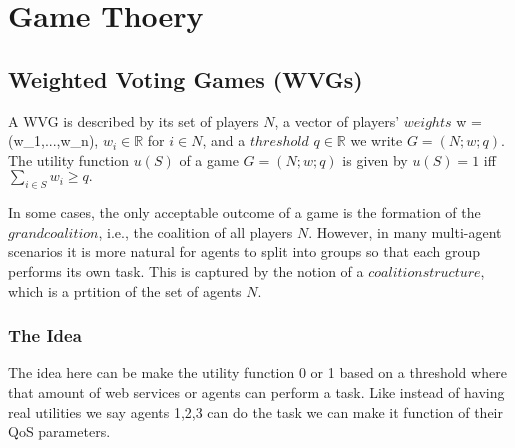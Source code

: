 \documentclass{article}
\begin{document}
\section{Game Thoery}

\subsection{Weighted Voting Games (WVGs)}

\cite{Chalkiadakis_simplecoalitional} A WVG is described by its set of players $N$, a vector of players' $weights$ w = (w_1,...,w_n), $w_i \in \mathbb{R}$ for $i \in N$, and a $threshold$ $q \in \mathbb{R}$ we write $G = (N; w; q)$. The utility function $u(S)$ of a game $G = (N; w; q)$ is given by $u(S) = 1$ iff $\sum_{i \in S} w_i \geq q.$

In some cases, the only acceptable outcome of a game is the formation of the $grand coalition$, i.e., the coalition of all players $N$. However, in many multi-agent scenarios it is more natural for agents to split into groups so that each group performs its own task. This is captured by the notion of a $coalition structure$, which is a prtition of the set of agents $N$.

\subsubsection{The Idea}
The idea here can be make the utility function 0 or 1 based on a threshold where that amount of web services or agents can perform a task. Like instead of having real utilities we say agents 1,2,3 can do the task we can make it function of their QoS parameters.





\end{document}
